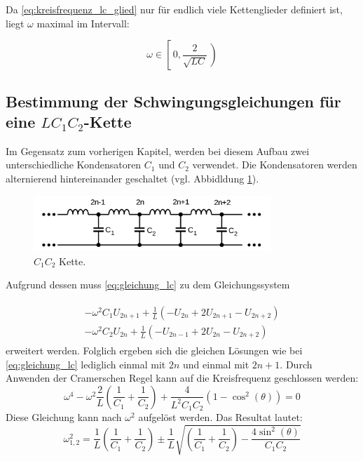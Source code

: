 Da \eqref{eq:kreisfrequenz_lc_glied} nur für endlich viele Kettenglieder definiert ist,
liegt $\omega$ maximal im Intervall: %

\begin{equation}
\label{eq:menge_omega_lc_glied}
\omega\in\left[\,0,\frac{2}{\sqrt{LC}}\,\right)
\end{equation}

\subsection{Bestimmung der Schwingungsgleichungen für eine $LC_1C_2$-Kette}
Im Gegensatz zum vorherigen Kapitel, werden bei diesem Aufbau zwei unterschiedliche
Kondensatoren $C_1$ und $C_2$ verwendet. Die Kondensatoren werden
alternierend hintereinander geschaltet (vgl. Abbidldung \ref{fig:alternierende_kette}).

\begin{figure}
  \centering
  \includegraphics[width=0.8\textwidth]{bilder/alternierende_kette.png}
  \caption{$C_1C_2$ Kette.\cite{anleitung356}}
  \label{fig:alternierende_kette}
\end{figure}


Aufgrund dessen muss \eqref{eq:gleichung_lc} zu dem Gleichungssystem

\begin{align}
\label{eq:lc1c2_gleichungsy}
\begin{aligned}
-\omega^2C_1U_{2n+1}+\frac{1}{L}\left(-U_{2n}+2U_{2n+1}-U_{2n+2}\right)\\
-\omega^2C_2U_{2n}+\frac{1}{L}\left(-U_{2n-1}+2U_{2n}-U_{2n+2}\right)
\end{aligned}
\end{align}
erweitert werden.
Folglich ergeben sich die gleichen Lösungen wie bei \eqref{eq:gleichung_lc}
lediglich einmal mit $2n$ und einmal mit $2n+1$.
Durch Anwenden der Cramerschen Regel kann auf die Kreisfrequenz geschlossen werden: %
\begin{equation*}
\omega^4-\omega^2\frac{2}{L}\left(\frac{1}{C_1}+\frac{1}{C_2}\right)+\frac{4}{L^2C_1C_2}\left(1-\cos^2(\theta)\right)=0
\end{equation*}
Diese Gleichung kann nach $\omega^2$ aufgelöst werden.
Das Resultat lautet: %
\begin{equation}
\label{eq:omega_ceins_czwei}
\omega_{1,2}^{2}=\frac{1}{L}\left(\frac{1}{C_1}+\frac{1}{C_2}\right)\pm\frac{1}{L}\sqrt{\left(\frac{1}{C_1}+\frac{1}{C_2}\right)-\frac{4\sin^2(\theta)}{C_1C_2}}
\end{equation}

